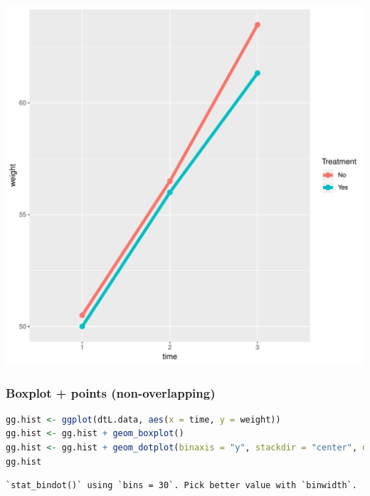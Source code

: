 \documentclass{article}
\begin{document}
\begin{center}
\includegraphics[width=.9\linewidth]{./figures/fig-meanTime.pdf}
\label{}
\end{center}

\clearpage
\subsubsection{Boxplot + points (non-overlapping)}
\label{sec:org59367e4}

\begin{lstlisting}[language=r,numbers=none]
gg.hist <- ggplot(dtL.data, aes(x = time, y = weight))
gg.hist <- gg.hist + geom_boxplot() 
gg.hist <- gg.hist + geom_dotplot(binaxis = "y", stackdir = "center", dotsize = 0.5)
gg.hist
\end{lstlisting}

\label{}
\begin{verbatim}
`stat_bindot()` using `bins = 30`. Pick better value with `binwidth`.
\end{verbatim}
\end{document}
